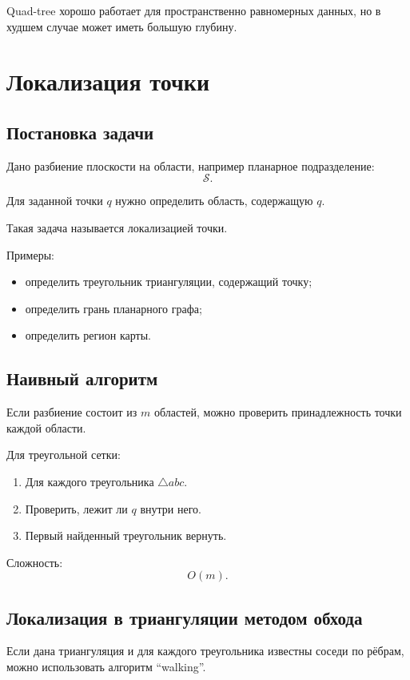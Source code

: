 \documentclass[12pt,a4paper]{article}
\begin{document}
Quad-tree хорошо работает для пространственно равномерных данных, но в худшем случае может иметь большую глубину.

\section{Локализация точки}

\subsection{Постановка задачи}

Дано разбиение плоскости на области, например планарное подразделение:
\[
\mathcal{S}.
\]

Для заданной точки \(q\) нужно определить область, содержащую \(q\).

Такая задача называется локализацией точки.

Примеры:

\begin{itemize}
    \item определить треугольник триангуляции, содержащий точку;
    \item определить грань планарного графа;
    \item определить регион карты.
\end{itemize}

\subsection{Наивный алгоритм}

Если разбиение состоит из \(m\) областей, можно проверить принадлежность точки каждой области.

Для треугольной сетки:

\begin{enumerate}
    \item Для каждого треугольника \(\triangle abc\).
    \item Проверить, лежит ли \(q\) внутри него.
    \item Первый найденный треугольник вернуть.
\end{enumerate}

Сложность:
\[
O(m).
\]

\subsection{Локализация в триангуляции методом обхода}

Если дана триангуляция и для каждого треугольника известны соседи по рёбрам, можно использовать алгоритм ``walking''.
\end{document}
